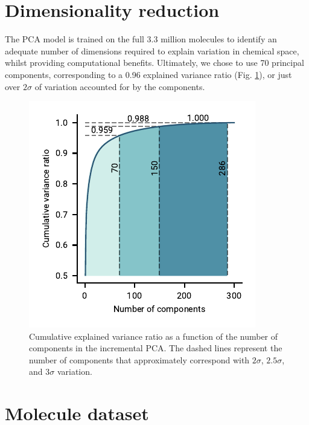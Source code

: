 \documentclass[twocolumn]{aastex63}
\begin{document}
\appendix

\renewcommand{\thefigure}{A\arabic{figure}}
\renewcommand{\thetable}{A\arabic{table}}
\renewcommand{\theequation}{A\arabic{equation}}
\setcounter{figure}{0}
\setcounter{table}{0}
\setcounter{equation}{0}

\section{Dimensionality reduction \label{sec:pca}}

The PCA model is trained on the full 3.3 million molecules to identify an adequate number of dimensions required to explain variation in chemical space, whilst providing computational benefits. Ultimately, we chose to use 70 principal components, corresponding to a 0.96 explained variance ratio (Fig. \ref{fig:pca}), or just over $2\sigma$ of variation accounted for by the components.

\begin{figure}[ht]
    \centering
    \includegraphics{pca_variance.pdf}
    \caption{Cumulative explained variance ratio as a function of the number of components in the incremental PCA. The dashed lines represent the number of components that approximately correspond with $2\sigma$, $2.5\sigma$, and $3\sigma$ variation.}
    \label{fig:pca}
\end{figure}

\section{Molecule dataset}
\end{document}
